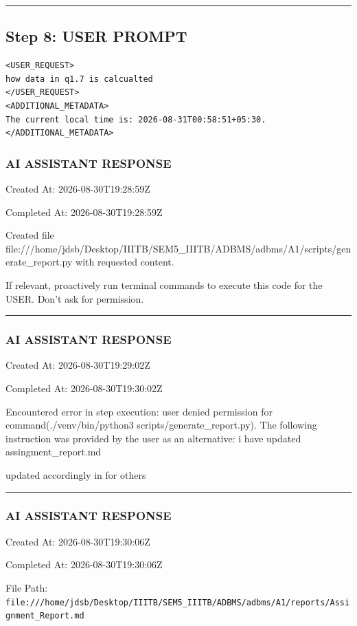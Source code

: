 \documentclass[11pt,a4paper]{article}
\begin{document}
{\hrule

\subsection{Step 8: USER PROMPT}

\begin{lstlisting}[language=text]
<USER_REQUEST>
how data in q1.7 is calcualted 
</USER_REQUEST>
<ADDITIONAL_METADATA>
The current local time is: 2026-08-31T00:58:51+05:30.
</ADDITIONAL_METADATA>
\end{lstlisting}


\subsubsection{AI ASSISTANT RESPONSE}

Created At: 2026-08-30T19:28:59Z

Completed At: 2026-08-30T19:28:59Z

Created file file:///home/jdsb/Desktop/IIITB/SEM5\_IIITB/ADBMS/adbms/A1/scripts/generate\_report.py with requested content.

If relevant, proactively run terminal commands to execute this code for the USER. Don't ask for permission.


\hrule

\subsubsection{AI ASSISTANT RESPONSE}

Created At: 2026-08-30T19:29:02Z

Completed At: 2026-08-30T19:30:02Z


Encountered error in step execution: user denied permission for command(./venv/bin/python3 scripts/generate\_report.py). The following instruction was provided by the user as an alternative: i have updated assingment\_report.md

updated accordingly in  for others


\hrule

\subsubsection{AI ASSISTANT RESPONSE}

Created At: 2026-08-30T19:30:06Z

Completed At: 2026-08-30T19:30:06Z

File Path: \texttt{file:///home/jdsb/Desktop/IIITB/SEM5\_IIITB/ADBMS/adbms/A1/reports/Assignment\_Report.md}

}
\end{document}
